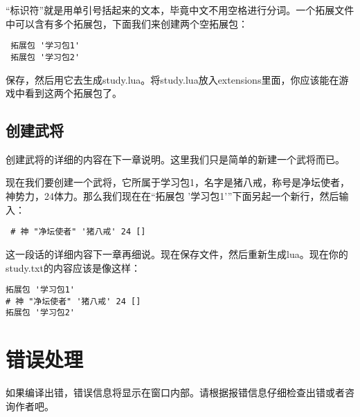 “标识符”就是用单引号括起来的文本，毕竟中文不用空格进行分词。一个拓展文件中可以含有多个拓展包，下面我们来创建两个空拓展包：

\begin{verbatim}
 拓展包 '学习包1'
 拓展包 '学习包2'
\end{verbatim}

保存，然后用它去生成study.lua。将study.lua放入extensions里面，你应该能在游戏中看到这两个拓展包了。

\subsection{创建武将}

创建武将的详细的内容在下一章说明。这里我们只是简单的新建一个武将而已。

现在我们要创建一个武将，它所属于学习包1，名字是猪八戒，称号是净坛使者，神势力，24体力。那么我们现在在“拓展包 '学习包1'”下面另起一个新行，然后输入：

\begin{verbatim}
 # 神 "净坛使者" '猪八戒' 24 []
\end{verbatim}

这一段话的详细内容下一章再细说。现在保存文件，然后重新生成lua。现在你的study.txt的内容应该是像这样：

\begin{verbatim}
拓展包 '学习包1'
# 神 "净坛使者" '猪八戒' 24 []
拓展包 '学习包2'
\end{verbatim}

\section{错误处理}

如果编译出错，错误信息将显示在窗口内部。请根据报错信息仔细检查出错或者咨询作者吧。
